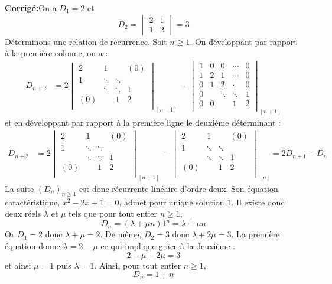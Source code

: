 \documentclass[a4paper,twoside,french,11pt]{VcCours}
\newcommand{\corr}{\textbf{Corrigé:}}
\begin{document}
\corr On a $D_1=2$ et 
$$ D_2 = \begin{vmatrix}
2 & 1 \\
1 & 2 
\end{vmatrix} = 3$$
Déterminons une relation de récurrence. Soit $n \geq 1$. On développant par rapport à la première colonne, on a :
\begin{align*}
D_{n+2} & = 2  \begin{vmatrix}
        2 & 1 & {} & {(0)} \\
        1 & \ddots & \ddots & {} \\
        {} & \ddots & \ddots & 1 \\
        {(0)} & {} & 1 & 2 \\
    \end{vmatrix}_{[n+1]} - \, \begin{vmatrix}
        1 & 0 & 0 & \cdots & 0 \\
        1 & 2 & 1 & \cdots & 0  \\
        0 & 1 & 2 & \cdot & 0 \\
        0 & &\ddots  & \ddots & 1 \\
        0 & 0 & & 1 & 2 \\
    \end{vmatrix}_{[n+1]}
\end{align*}
et en développant par rapport à la première ligne le deuxième déterminant :
\begin{align*}
D_{n+2} & = 2  \begin{vmatrix}
        2 & 1 & {} & {(0)} \\
        1 & \ddots & \ddots & {} \\
        {} & \ddots & \ddots & 1 \\
        {(0)} & {} & 1 & 2 \\
    \end{vmatrix}_{[n+1]} -  \,\begin{vmatrix}
        2 & 1 & {} & {(0)} \\
        1 & \ddots & \ddots & {} \\
        {} & \ddots & \ddots & 1 \\
        {(0)} & {} & 1 & 2 \\
    \end{vmatrix}_{[n]}  = 2 D_{n+1} - D_n 
\end{align*}
La suite $(D_n)_{n \geq 1}$ est donc récurrente linéaire d'ordre deux. Son équation caractéristique, $x^2-2x+1=0$, admet pour unique solution $1$. Il existe donc deux réels $\lambda$ et $\mu$ tels que pour tout entier $n \geq 1$,
$$ D_n = (\lambda+ \mu n) 1^n = \lambda + \mu n$$
Or $D_1=2$ donc $\lambda+\mu =2$. De même, $D_2=3$ donc $\lambda+ 2 \mu = 3$. La première équation donne $\lambda = 2- \mu$ ce qui implique grâce à la deuxième :
$$  2- \mu + 2 \mu = 3$$
et ainsi $ \mu =1$ puis $\lambda=1$. Ainsi, pour tout entier $n \geq 1$,
$$ D_n = 1+n$$
\end{document}
